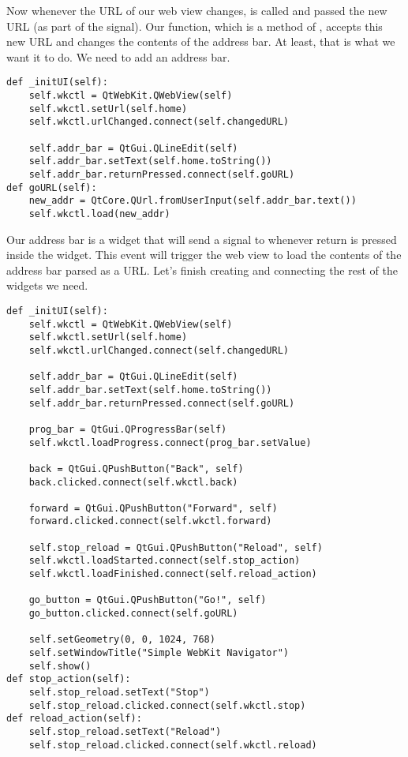 Now whenever the URL of our web view changes,  is called and passed the new URL (as part of the signal).
Our function, which is a method of , accepts this new URL and changes the contents of the address bar.
At least, that is what we want it to do.
We need to add an address bar.
\begin{lstlisting}
def _initUI(self):
    self.wkctl = QtWebKit.QWebView(self)
    self.wkctl.setUrl(self.home)
    self.wkctl.urlChanged.connect(self.changedURL)
    
    self.addr_bar = QtGui.QLineEdit(self)
    self.addr_bar.setText(self.home.toString())
    self.addr_bar.returnPressed.connect(self.goURL)
def goURL(self):
    new_addr = QtCore.QUrl.fromUserInput(self.addr_bar.text())
    self.wkctl.load(new_addr)
\end{lstlisting}
Our address bar is a  widget that will send a signal to  whenever return is pressed inside the widget.
This event will trigger the web view to load the contents of the address bar parsed as a URL.
Let's finish creating and connecting the rest of the widgets we need.
\begin{lstlisting}
def _initUI(self):
    self.wkctl = QtWebKit.QWebView(self)
    self.wkctl.setUrl(self.home)
    self.wkctl.urlChanged.connect(self.changedURL)
    
    self.addr_bar = QtGui.QLineEdit(self)
    self.addr_bar.setText(self.home.toString())
    self.addr_bar.returnPressed.connect(self.goURL)
    
    prog_bar = QtGui.QProgressBar(self)
    self.wkctl.loadProgress.connect(prog_bar.setValue)
    
    back = QtGui.QPushButton("Back", self)
    back.clicked.connect(self.wkctl.back)
    
    forward = QtGui.QPushButton("Forward", self)
    forward.clicked.connect(self.wkctl.forward)
    
    self.stop_reload = QtGui.QPushButton("Reload", self)
    self.wkctl.loadStarted.connect(self.stop_action)
    self.wkctl.loadFinished.connect(self.reload_action)
    
    go_button = QtGui.QPushButton("Go!", self)
    go_button.clicked.connect(self.goURL)
    
    self.setGeometry(0, 0, 1024, 768)
    self.setWindowTitle("Simple WebKit Navigator")
    self.show()
def stop_action(self):
    self.stop_reload.setText("Stop")
    self.stop_reload.clicked.connect(self.wkctl.stop)
def reload_action(self):
    self.stop_reload.setText("Reload")
    self.stop_reload.clicked.connect(self.wkctl.reload)
\end{lstlisting}
